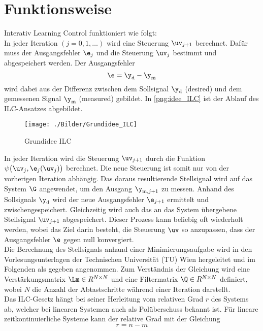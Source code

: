\section{Funktionsweise}
\label{sec_funktionsweise}
Interativ Learning Control funktioniert wie folgt:\\
In jeder Iteration $\left(j=0,1,\ldots\right)$ wird eine Steuerung $\uv_{j+1}$ berechnet. Dafür muss der Ausgangsfehler $\e_j$ und die Steuerung $\uv_j$ bestimmt und abgespeichert werden. Der Ausgangsfehler 
\begin{equation}
	\label{eq:e_yd_ym}
	\e = \y_\mathrm{d} - \y_\mathrm{m}
\end{equation}
wird dabei aus der Differenz zwischen dem Sollsignal $\y_\mathrm{d}$ (desired) und dem gemessenen Signal $\y_\mathrm{m}$ (measured) gebildet. In \autoref{png:idee_ILC} ist der Ablauf des ILC-Ansatzes abgebildet. 
\begin{figure}[H]
	\centering
	\texttt{[image: ./Bilder/Grundidee\_ILC]}
	\caption{Grundidee ILC \cite{UniWien}}
	\label{png:idee_ILC}
\end{figure}
In jeder Iteration wird die Steuerung $\uv_{j+1}$ durch die Funktion $\psi\bigl(\uv_j,\e_j(\uv_j)\bigr)$ berechnet. Die neue Steuerung ist somit nur von der vorherigen Iteration abhängig. Das daraus resultierende Stellsignal wird auf das System $\G$ angewendet, um den Ausgang $\y_{\mathrm{m},j+1}$ zu messen. Anhand des Sollsignals $\y_\mathrm{d}$ wird der neue Ausgangsfehler $\e_{j+1}$ ermittelt und zwischengespeichert. Gleichzeitig wird auch das an das System übergebene Stellsignal $\uv_{j+1}$ abgespeichert. Dieser Prozess kann beliebig oft wiederholt werden, wobei das Ziel darin besteht, die Steuerung $\uv$ so anzupassen, dass der Ausgangsfehler $\e$ gegen null konvergiert. \\
Die Berechnung des Stellsignals anhand einer Minimierungsaufgabe wird in den Vorlesungsunterlagen der Technischen Universität (TU) Wien \cite[9]{UniWien} hergeleitet und im Folgenden als gegeben angenommen. Zum Verständnis der Gleichung wird eine Verstärkungsmatrix $\Lm \in R^{N \times N}$ und eine Filtermatrix $\Q \in R^{N \times N}$ definiert, wobei $N$ die Anzahl der Abtastschritte während einer Iteration darstellt.\\
Das ILC-Gesetz hängt bei seiner Herleitung vom relativen Grad $r$ des Systems ab, welcher bei linearen Systemen auch als Polüberschuss bekannt ist. Für lineare zeitkontinuierliche Systeme kann der relative Grad mit der Gleichung
\begin{equation}
	\label{eq:r}
	r = n-m
\end{equation}
